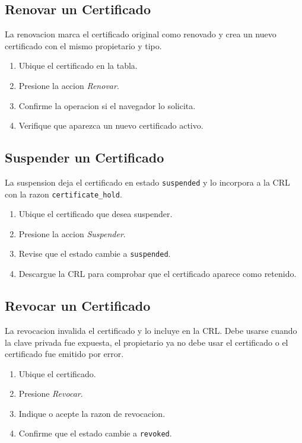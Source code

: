 \documentclass[12pt,a4paper]{article}
\begin{document}
\subsection{Renovar un Certificado}

La renovacion marca el certificado original como renovado y crea un nuevo certificado con el mismo propietario y tipo.

\begin{enumerate}[leftmargin=*]
    \item Ubique el certificado en la tabla.
    \item Presione la accion \textit{Renovar}.
    \item Confirme la operacion si el navegador lo solicita.
    \item Verifique que aparezca un nuevo certificado activo.
\end{enumerate}

\subsection{Suspender un Certificado}

La suspension deja el certificado en estado \texttt{suspended} y lo incorpora a la CRL con la razon \texttt{certificate\_hold}.

\begin{enumerate}[leftmargin=*]
    \item Ubique el certificado que desea suspender.
    \item Presione la accion \textit{Suspender}.
    \item Revise que el estado cambie a \texttt{suspended}.
    \item Descargue la CRL para comprobar que el certificado aparece como retenido.
\end{enumerate}

\subsection{Revocar un Certificado}

La revocacion invalida el certificado y lo incluye en la CRL. Debe usarse cuando la clave privada fue expuesta, el propietario ya no debe usar el certificado o el certificado fue emitido por error.

\begin{enumerate}[leftmargin=*]
    \item Ubique el certificado.
    \item Presione \textit{Revocar}.
    \item Indique o acepte la razon de revocacion.
    \item Confirme que el estado cambie a \texttt{revoked}.
\end{enumerate}
\end{document}
